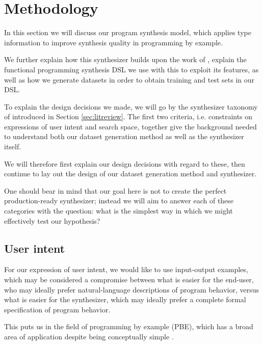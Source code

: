 \documentclass{article}
\begin{document}


\section{Methodology} %

In this section we will discuss our program synthesis model,
which applies type information to improve synthesis quality in programming by example.

We further explain how this synthesizer builds upon the work of \citet{nsps},
explain the functional programming synthesis DSL we use with this to exploit its features,
as well as how we generate datasets in order to obtain training and test sets in our DSL.

To explain the design decisions we made,
we will go by the synthesizer taxonomy of \citet{gulwani2017program} introduced in Section \ref{sec:litreview}.
The first two criteria, i.e. constraints on expressions of user intent and search space,
together give the background needed to understand both our dataset generation method as well as the synthesizer itself.

We will therefore first explain our design decisions with regard to these,
then continue to lay out the design of our dataset generation method and synthesizer.

One should bear in mind that our goal here is not to create the perfect production-ready synthesizer;
instead we will aim to answer each of these categories with the question:
what is the simplest way in which we might effectively test our hypothesis?

\subsection{User intent}

For our expression of user intent, we would like to use input-output examples,
which may be considered a compromise between what is easier for the end-user,
who may ideally prefer natural-language descriptions of program behavior,
versus what is easier for the synthesizer,
which may ideally prefer a complete formal specification of program behavior.

This puts us in the field of programming by example (PBE),
which has a broad area of application despite being conceptually simple%
.
\end{document}
